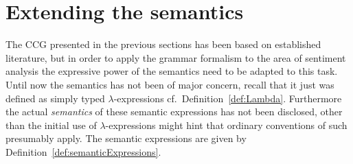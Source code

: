 \section{Extending the semantics}
\label{sec:extendingSemantics}
The CCG presented in the previous sections has been based on established literature, but in order to apply the grammar formalism to the area of sentiment analysis the expressive power of the semantics need to be adapted to this task. Until now the semantics has not been of major concern, recall that it just was defined as simply typed $\lambda$-expressions cf.\ Definition~\ref{def:Lambda}. Furthermore the actual \emph{semantics} of these semantic expressions has not been disclosed, other than the initial use of $\lambda$-expressions might hint that ordinary conventions of such presumably apply. The semantic expressions are given by Definition~\ref{def:semanticExpressions}.


